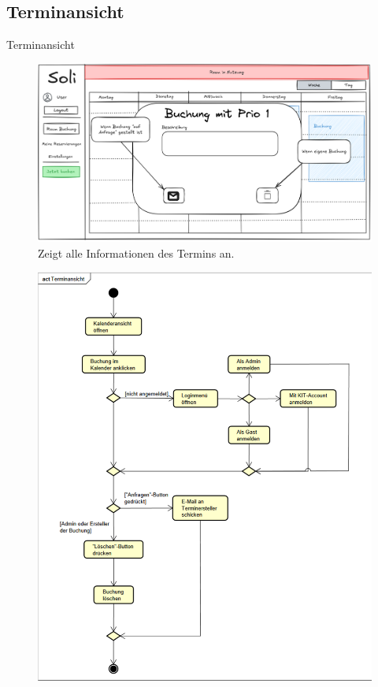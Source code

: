 \documentclass{sdqbeamer}
\begin{document}
\subsection{Terminansicht}
\begin{frame}{Terminansicht}
    \begin{figure}
        \centering
        \includegraphics[width=\textwidth]{pictures/figures/ui/reservierunginkalendar}
        \caption{Zeigt alle Informationen des Termins an.}
        \label{fig:terminansicht}
    \end{figure}
\end{frame}

\begin{frame}
    \begin{figure}
        \centering
        \includegraphics[width=\textwidth]{pictures/figures/activity/terminansicht}
        \label{fig:terminansichtprozess}
    \end{figure}
\end{frame}
\end{document}
